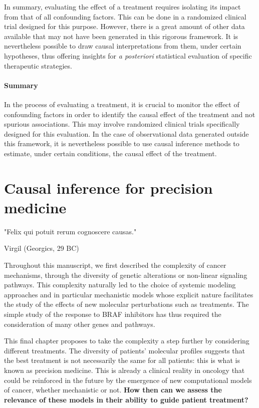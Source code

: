 \documentclass[a4paper,12pt,twoside,onecolumn,openright,final,oldfontcommands]{memoir}
\newcommand{\initial}[1]{
	\lettrine[lines=3,lhang=0.33,nindent=0em]{
		\color{gray}
     		{\textsc{#1}}}{}}
\let\BeginKnitrBlock\begin \let\EndKnitrBlock\end
\begin{document}
In summary, evaluating the effect of a treatment requires isolating its
impact from that of all confounding factors. This can be done in a
randomized clinical trial designed for this purpose. However, there is a
great amount of other data available that may not have been generated in
this rigorous framework. It is nevertheless possible to draw causal
interpretations from them, under certain hypotheses, thus offering
insights for \emph{a posteriori} statistical evaluation of specific
therapeutic strategies.

\BeginKnitrBlock{conclubox}
\subsubsection*{Summary}\label{summary-7}

In the process of evaluating a treatment, it is crucial to monitor the
effect of confounding factors in order to identify the causal effect of
the treatment and not spurious associations. This may involve randomized
clinical trials specifically designed for this evaluation. In the case
of observational data generated outside this framework, it is
nevertheless possible to use causal inference methods to estimate, under
certain conditions, the causal effect of the treatment.
\EndKnitrBlock{conclubox}

\chapter{Causal inference for precision
medicine}\label{chapter-precision}

\epigraph{"Felix qui potuit rerum cognoscere causas."}{Virgil (Georgics, 29 BC)}

\initial{T}hroughout this manuscript, we first described the complexity
of cancer mechanisms, through the diversity of genetic alterations or
non-linear signaling pathways. This complexity naturally led to the
choice of systemic modeling approaches and in particular mechanistic
models whose explicit nature facilitates the study of the effects of new
molecular perturbations such as treatments. The simple study of the
response to BRAF inhibitors has thus required the consideration of many
other genes and pathways.

This final chapter proposes to take the complexity a step further by
considering different treatments. The diversity of patients' molecular
profiles suggests that the best treatment is not necessarily the same
for all patients: this is what is known as precision medicine. This is
already a clinical reality in oncology that could be reinforced in the
future by the emergence of new computational models of cancer, whether
mechanistic or not. \textbf{How then can we assess the relevance of
these models in their ability to guide patient treatment?}
\end{document}
